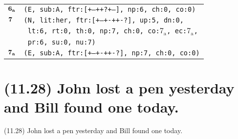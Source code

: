 \documentclass{article}
\begin{document}
\begin{minipage}{\textwidth}
{\begin{tabular}{|r|l|}
    ${\textbf{\textrm{6}}_{\textbf{\textrm{a}}}}$ & \texttt{\texttt{(E,~sub:A,~ftr:[+--++?+--],~np:6,~ch:0,~co:0)}} \\
    ${\textbf{\textrm{7}}_{\phantom{z}}}$ & \texttt{\texttt{(N,~lit:her,~ftr:[+--+-++-?],~up:5,~dn:0,}} \\
    & \texttt{\texttt{~lt:6,~rt:0,~th:0,~np:7,~ch:0,~co:${\textrm{7}_{\textrm{a}}}$,~ec:${\textrm{7}_{\textrm{a}}}$,}} \\
    & \texttt{\texttt{~pr:6,~su:0,~nu:7)}} \\
    ${\textbf{\textrm{7}}_{\textbf{\textrm{a}}}}$ & \texttt{\texttt{(E,~sub:A,~ftr:[+--+-++-?],~np:7,~ch:0,~co:0)}} \\
    \hline
  \end{tabular}
  }
\end{minipage}
\bigbreak

\clearpage

%
%

\section*{(11.28) John lost a pen yesterday and Bill found one today.}

\bigbreak
\begin{enumerate*}
\item[(11.28)] John lost a pen yesterday and Bill found one today.
\end{enumerate*}
\bigbreak
\end{document}
